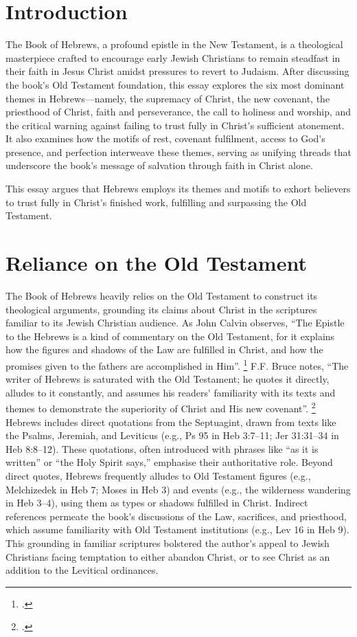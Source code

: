 \documentclass[12pt]{article}
\def\apos{^^27}         %
\def\jesus{Yeshua}
\def\christ{the Messiah}
\def\jesus{Jesus}
\def\christ{Christ}
\begin{document}
\section{Introduction}
The Book of Hebrews, a profound epistle in the New Testament, is a theological
masterpiece crafted to encourage early Jewish Christians to remain steadfast in
their faith in \jesus{} \christ{} amidst pressures to revert to Judaism. After
discussing the book\apos{}s Old Testament foundation, this essay explores the
six most dominant themes in Hebrews---namely, the supremacy of \christ{}, the
new covenant, the priesthood of \christ{}, faith and perseverance, the call to
holiness and worship, and the critical warning against failing to trust fully in
\christ{}\apos{}s sufficient atonement. It also examines how the motifs of rest,
covenant fulfilment, access to God\apos{}s presence, and perfection interweave
these themes, serving as unifying threads that underscore the book\apos{}s
message of salvation through faith in \christ{} alone.

This essay argues that Hebrews employs its themes and motifs to exhort believers
to trust fully in \christ{}\apos{}s finished work, fulfilling and surpassing the
Old Testament.

\section{Reliance on the Old Testament} The Book of Hebrews heavily relies on
the Old Testament to construct its theological arguments, grounding its claims
about \christ{} in the scriptures familiar to its Jewish Christian audience. As
John Calvin observes, ``The Epistle to the Hebrews is a kind of commentary on
the Old Testament, for it explains how the figures and shadows of the Law are
fulfilled in \christ{}, and how the promises given to the fathers are
accomplished in Him''.  \footcite[7]{Calvin1853}
%
F.F. Bruce notes, ``The writer of Hebrews is saturated with the
Old Testament; he quotes it directly, alludes to it constantly, and assumes his
readers\apos{} familiarity with its texts and themes to demonstrate the
superiority of Christ and His new covenant''. \footcite[14]{Bruce1964}
%
Hebrews includes direct quotations from the Septuagint, drawn from texts like
the Psalms, Jeremiah, and Leviticus (e.g., Ps 95 in Heb 3:7--11; Jer 31:31--34
in Heb 8:8--12).
%
These quotations, often introduced with phrases like ``as it is written'' or
``the Holy Spirit says,'' emphasise their authoritative role.
Beyond direct quotes, Hebrews frequently alludes to Old Testament figures (e.g.,
Melchizedek in Heb 7; Moses in Heb 3) and events (e.g., the wilderness wandering
in Heb 3--4), using them as types or shadows fulfilled in \christ{}.
Indirect references permeate the book\apos{}s discussions of the Law,
sacrifices, and priesthood, which assume familiarity with Old Testament
institutions (e.g., Lev 16 in Heb 9).
%
This grounding in familiar scriptures bolstered the author\apos{}s appeal to
Jewish Christians facing temptation to either abandon \christ{}, or to see
\christ{} as an addition to the Levitical ordinances.
\end{document}
